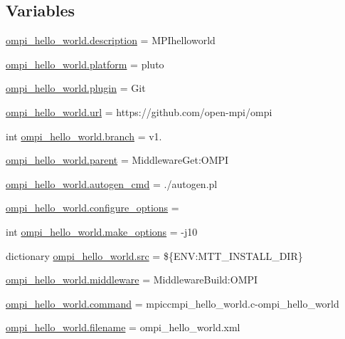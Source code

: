 \subsection*{Variables}
\begin{DoxyCompactItemize}
\item 
\hyperlink{namespaceompi__hello__world_a52b9c10821e333fe5c7413d414abeb1b}{ompi\-\_\-hello\-\_\-world.\-description} = M\-P\-Ihelloworld
\item 
\hyperlink{namespaceompi__hello__world_af8ab2503d0ec334a65a72e930a24e713}{ompi\-\_\-hello\-\_\-world.\-platform} = pluto
\item 
\hyperlink{namespaceompi__hello__world_a687eab84563b30840a200bfaf5407f51}{ompi\-\_\-hello\-\_\-world.\-plugin} = Git
\item 
\hyperlink{namespaceompi__hello__world_ae0dcf6cc43abc8d11428686639a5059a}{ompi\-\_\-hello\-\_\-world.\-url} = https\-://github.\-com/open-\/mpi/ompi
\item 
int \hyperlink{namespaceompi__hello__world_a34c1b9feb533b831fb7b0cd036494718}{ompi\-\_\-hello\-\_\-world.\-branch} = v1.
\item 
\hyperlink{namespaceompi__hello__world_a5508612e06f3402554fdda7a9eca7d62}{ompi\-\_\-hello\-\_\-world.\-parent} = Middleware\-Get\-:\-O\-M\-P\-I
\item 
\hyperlink{namespaceompi__hello__world_ab26bf3479d404017c9d0623f42e9dcd3}{ompi\-\_\-hello\-\_\-world.\-autogen\-\_\-cmd} = ./autogen.\-pl
\item 
\hyperlink{namespaceompi__hello__world_a7b6bd890daea8a06c3daea5019b415f1}{ompi\-\_\-hello\-\_\-world.\-configure\-\_\-options} =
\item 
int \hyperlink{namespaceompi__hello__world_a3b1603e3acde68a17311cb93a6a5ef12}{ompi\-\_\-hello\-\_\-world.\-make\-\_\-options} = -\/j10
\item 
dictionary \hyperlink{namespaceompi__hello__world_a88a2db81a1836d83ed41abd7d39c9c4e}{ompi\-\_\-hello\-\_\-world.\-src} = \$\{E\-N\-V\-:\-M\-T\-T\-\_\-\-I\-N\-S\-T\-A\-L\-L\-\_\-\-D\-I\-R\}
\item 
\hyperlink{namespaceompi__hello__world_a64807561a94c3ff5b1c9a945e580f643}{ompi\-\_\-hello\-\_\-world.\-middleware} = Middleware\-Build\-:\-O\-M\-P\-I
\item 
\hyperlink{namespaceompi__hello__world_aa34adcfe660e349e3d2d9f69eb9412bb}{ompi\-\_\-hello\-\_\-world.\-command} = mpiccmpi\-\_\-hello\-\_\-world.\-c-\/ompi\-\_\-hello\-\_\-world
\item 
\hyperlink{namespaceompi__hello__world_ae42ce8011012447dba87c7337e9ddab8}{ompi\-\_\-hello\-\_\-world.\-filename} = ompi\-\_\-hello\-\_\-world.\-xml
\end{DoxyCompactItemize}
